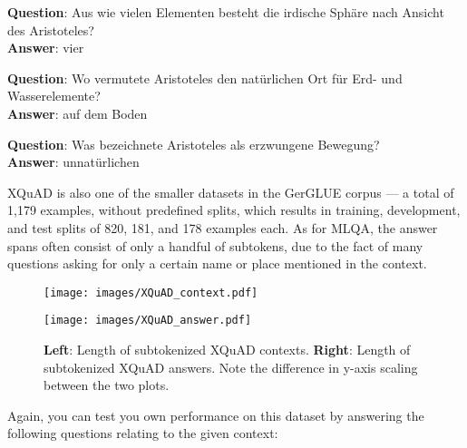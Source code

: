 \begin{examples}
        \textbf{Question}: Aus wie vielen Elementen besteht die irdische Sphäre nach Ansicht des Aristoteles?\\
        \textbf{Answer}: vier

        \textbf{Question}: Wo vermutete Aristoteles den natürlichen Ort für Erd- und Wasserelemente?\\
        \textbf{Answer}: auf dem Boden

        \textbf{Question}: Was bezeichnete Aristoteles als erzwungene Bewegung?\\
        \textbf{Answer}: unnatürlichen
\end{examples}


XQuAD is also one of the smaller datasets in the GerGLUE corpus --- a total
of 1,179 examples, without predefined splits, which results in training, development, and test
splits of 820, 181, and 178 examples each. As for MLQA, the answer spans often consist of
only a handful of subtokens, due to the fact of many questions asking for only a certain
name or place mentioned in the context.



\begin{figure}
  \begin{minipage}{0.45\linewidth}
  \vspace{0pt}
    \texttt{[image: images/XQuAD\_context.pdf]}
  \end{minipage}
  \hfill
  \begin{minipage}{0.45\linewidth}
  \vspace{0pt}
    \texttt{[image: images/XQuAD\_answer.pdf]}
  \end{minipage}
  \caption[XQuAD Lengths]{\textbf{Left}: Length of subtokenized XQuAD contexts.
                         \textbf{Right}: Length of subtokenized XQuAD answers. Note the difference in y-axis scaling between the two plots.}
  \label{fig:xquad-stats}
\end{figure}

Again, you can test you own performance on this dataset by answering the following questions relating
to the given context:

